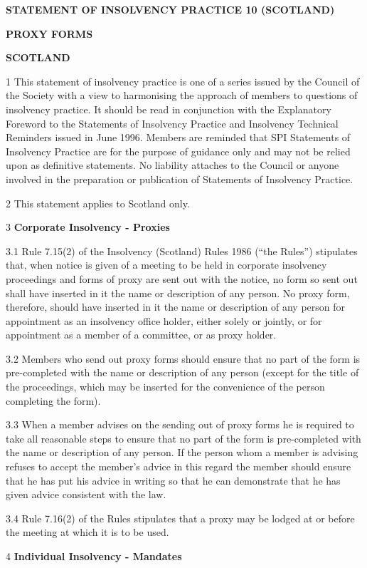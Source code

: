\documentclass[11pt,a4paper]{article}
\begin{document}
\textbf{STATEMENT  OF  INSOLVENCY  PRACTICE  10  (SCOTLAND)}

\textbf{PROXY  FORMS}

\textbf{SCOTLAND}

1	This statement of insolvency practice is one of a series issued by the Council of the Society with a view to harmonising the approach of members to questions of insolvency practice.  It should be read in conjunction with the Explanatory Foreword to the Statements of Insolvency Practice and Insolvency Technical Reminders issued in June 1996.  Members are reminded that SPI Statements of Insolvency Practice are for the purpose of guidance only and may not be relied upon as definitive statements.  No liability attaches to the Council or anyone involved in the preparation or publication of Statements of Insolvency Practice.

2	This statement applies to Scotland only.

3	\textbf{Corporate Insolvency - Proxies}

3.1	Rule 7.15(2) of the Insolvency (Scotland) Rules 1986 (“the Rules”) stipulates that, when notice is given of a meeting to be held in corporate insolvency proceedings and forms of proxy are sent out with the notice, no form so sent out shall have inserted in it the name or description of any person.  No proxy form, therefore, should have inserted in it the name or description of any person for appointment as an insolvency office holder, either solely or jointly, or for appointment as a member of a committee, or as proxy holder.

3.2	Members who send out proxy forms should ensure that no part of the form is pre-completed with the name or description of any person (except for the title of the proceedings, which may be inserted for the convenience of the person completing the form).

3.3	When a member advises on the sending out of proxy forms he is required to take all reasonable steps to ensure that no part of the form is pre-completed with the name or description of any person.  If the person whom a member is advising refuses to accept the member’s advice in this regard the member should ensure that he has put his advice in writing so that he can demonstrate that he has given advice consistent with the law.

3.4	Rule 7.16(2) of the Rules stipulates that a proxy may be lodged at or before the meeting at which it is to be used.

4	\textbf{Individual Insolvency - Mandates}
\end{document}
